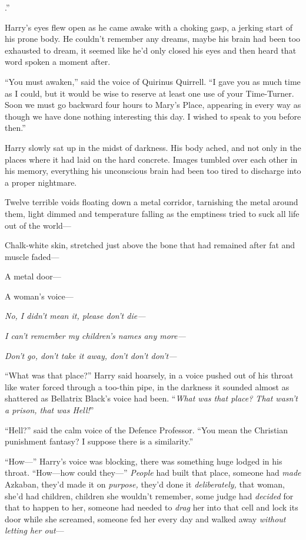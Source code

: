 
.”

\hplettrineextrapara
Harry’s eyes flew open as he came awake with a choking gasp, a jerking start of his prone body. He couldn’t remember any dreams, maybe his brain had been too exhausted to dream, it seemed like he’d only closed his eyes and then heard that word spoken a moment after.

“You must awaken,” said the voice of Quirinus Quirrell. “I gave you as much time as I could, but it would be wise to reserve at least one use of your Time-Turner. Soon we must go backward four hours to Mary’s Place, appearing in every way as though we have done nothing interesting this day. I wished to speak to you before then.”

Harry slowly sat up in the midst of darkness. His body ached, and not only in the places where it had laid on the hard concrete. Images tumbled over each other in his memory, everything his unconscious brain had been too tired to discharge into a proper nightmare.

Twelve terrible voids floating down a metal corridor, tarnishing the metal around them, light dimmed and temperature falling as the emptiness tried to suck all life out of the world—

Chalk-white skin, stretched just above the bone that had remained after fat and muscle faded—

A metal door—

A woman’s voice—

\emph{No, I didn’t mean it, please don’t die—}

\emph{I can’t remember my children’s names any more—}

\emph{Don’t go, don’t take it away, don’t don’t don’t—}

“What was that place?” Harry said hoarsely, in a voice pushed out of his throat like water forced through a too-thin pipe, in the darkness it sounded almost as shattered as Bellatrix Black’s voice had been. “\emph{What was that place? That wasn’t a prison, that was \emph{Hell!}}”

“Hell?” said the calm voice of the Defence Professor. “You mean the Christian punishment fantasy? I suppose there is a similarity.”

“How—” Harry’s voice was blocking, there was something huge lodged in his throat. “How—how could they—” \emph{People} had built that place, someone had \emph{made} Azkaban, they’d made it on \emph{purpose,} they’d done it \emph{deliberately,} that woman, she’d had children, children she wouldn’t remember, some judge had \emph{decided} for that to happen to her, someone had needed to \emph{drag} her into that cell and lock its door while she screamed, someone fed her every day and walked away \emph{without letting her out}—

